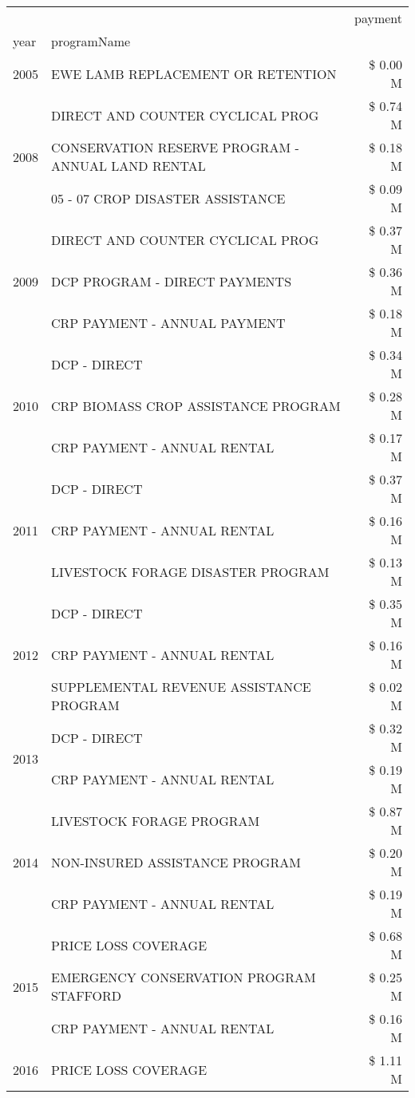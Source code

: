 \begin{tabular}{llr}
\toprule
 &  & payment \\
year & programName &  \\
\midrule
2005 & EWE LAMB REPLACEMENT OR RETENTION & \$ 0.00 M \\
\cline{1-3}
\multirow[t]{3}{*}{2008} & DIRECT AND COUNTER CYCLICAL PROG & \$ 0.74 M \\
 & CONSERVATION RESERVE PROGRAM - ANNUAL LAND RENTAL & \$ 0.18 M \\
 & 05 - 07 CROP DISASTER ASSISTANCE & \$ 0.09 M \\
\cline{1-3}
\multirow[t]{3}{*}{2009} & DIRECT AND COUNTER CYCLICAL PROG & \$ 0.37 M \\
 & DCP PROGRAM - DIRECT PAYMENTS & \$ 0.36 M \\
 & CRP PAYMENT - ANNUAL PAYMENT & \$ 0.18 M \\
\cline{1-3}
\multirow[t]{3}{*}{2010} & DCP - DIRECT & \$ 0.34 M \\
 & CRP BIOMASS CROP ASSISTANCE PROGRAM & \$ 0.28 M \\
 & CRP PAYMENT - ANNUAL RENTAL & \$ 0.17 M \\
\cline{1-3}
\multirow[t]{3}{*}{2011} & DCP - DIRECT & \$ 0.37 M \\
 & CRP PAYMENT - ANNUAL RENTAL & \$ 0.16 M \\
 & LIVESTOCK FORAGE DISASTER PROGRAM & \$ 0.13 M \\
\cline{1-3}
\multirow[t]{3}{*}{2012} & DCP - DIRECT & \$ 0.35 M \\
 & CRP PAYMENT - ANNUAL RENTAL & \$ 0.16 M \\
 & SUPPLEMENTAL REVENUE ASSISTANCE PROGRAM & \$ 0.02 M \\
\cline{1-3}
\multirow[t]{2}{*}{2013} & DCP - DIRECT & \$ 0.32 M \\
 & CRP PAYMENT - ANNUAL RENTAL & \$ 0.19 M \\
\cline{1-3}
\multirow[t]{3}{*}{2014} & LIVESTOCK FORAGE PROGRAM & \$ 0.87 M \\
 & NON-INSURED ASSISTANCE PROGRAM & \$ 0.20 M \\
 & CRP PAYMENT - ANNUAL RENTAL & \$ 0.19 M \\
\cline{1-3}
\multirow[t]{3}{*}{2015} & PRICE LOSS COVERAGE & \$ 0.68 M \\
 & EMERGENCY CONSERVATION PROGRAM STAFFORD & \$ 0.25 M \\
 & CRP PAYMENT - ANNUAL RENTAL & \$ 0.16 M \\
\cline{1-3}
\multirow[t]{3}{*}{2016} & PRICE LOSS COVERAGE & \$ 1.11 M \\

\end{tabular}
